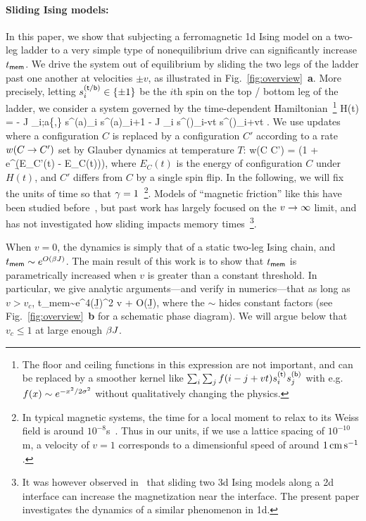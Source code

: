 \documentclass[prl,aps,twocolumn,groupedaddress,superscriptaddress,preprintnumbers,nobibnotes]{revtex4-2}
\newcommand{\tmem}{{t_{\sf mem}}}
\begin{document}
	\paragraph*{Sliding Ising models:} In this paper, we show that subjecting a ferromagnetic 1d Ising model on a two-leg ladder to a very simple type of nonequilibrium drive can significantly increase $\tmem$. We drive the system out of equilibrium by sliding the two legs of the ladder past one another at velocities $\pm v$, as illustrated in Fig.~\ref{fig:overview}~{\bf a}. More precisely, letting $s^{(\mathsf{t} / \mathsf{b})}_i \in \{ \pm 1\}$ be the $i$th spin on the top / bottom leg of the ladder, we consider a system governed by the time-dependent Hamiltonian~\footnote{The floor and ceiling functions in this expression are not important, and can be replaced by a smoother kernel like $\sum_i \sum_j f(i-j+vt) s_i^{(\mathsf{t})} s_j^{(\mathsf{b})}$ with e.g. $f(x) \sim e^{-x^2/{2\sigma^2}}$ without qualitatively changing the physics. } 
	\be \label{ham} H(t) = - J \sum_{i;a\in\{\sft,\sfb\}} s^{(a)}_i s^{(a)}_{i+1} - J \sum_i s^{(\sft)}_{\lfloor i-vt \rfloor} s^{(\sfb)}_{\lceil i+vt\rceil}  .\ee 
	We use updates where a configuration $C$ is replaced by a configuration $C'$ according to a rate $w(C\rightarrow C')$ set by Glauber dynamics at temperature $T$:
	\be w(C \ra C') = \g (1 + e^{\b (E_{C'}(t) - E_C(t))})\inv, \ee 
	where $E_C(t)$ is the energy of configuration $C$ under $H(t)$, and $C'$ differs from $C$ by a single spin flip. In the following, we will fix the units of time so that $\gamma=1$~\footnote{In typical magnetic systems, the time for a local moment to relax to its Weiss field is around $10^{-8}$s~\cite{angst2012strongly}. Thus in our units, if we use a lattice spacing of $10^{-10}$m, a velocity of $v=1$ corresponds to a dimensionful speed of around $1 \,{\rm cm}\, {\rm s}^{-1}$.}. 		
	Models of ``magnetic friction'' like this have been studied before~\cite{kadau2008magnetic,hucht2009nonequilibrium,hilhorst2011two}, but past work has largely focused on the $v \rightarrow\infty$ limit, and has not investigated how sliding impacts memory times~\footnote{It was however observed in~\cite{kadau2008magnetic} that sliding two 3d Ising models along a 2d interface can increase the magnetization near the interface. The present paper investigates the dynamics of a similar phenomenon in 1d.}. 
	
	
	
	When $v=0$, the dynamics is simply that of a static two-leg Ising chain, and $\tmem \sim e^{O( \b J)}$. The main result of this work is to show that $\tmem$ is parametrically increased when $v$ is greater than a constant threshold. In particular, we give analytic arguments---and verify in numerics---that as long as $v > v_c$,  
	\be \label{main_result} \tmem \sim  e^{4(\b J)^2 v   + O(\b J)},\ee
	where the $\sim$ hides constant factors (see Fig.~\ref{fig:overview}~{\bf b} for a schematic phase diagram). We will argue below that $v_c \leq 1$ at large enough $\beta J$. 
	
\end{document}
